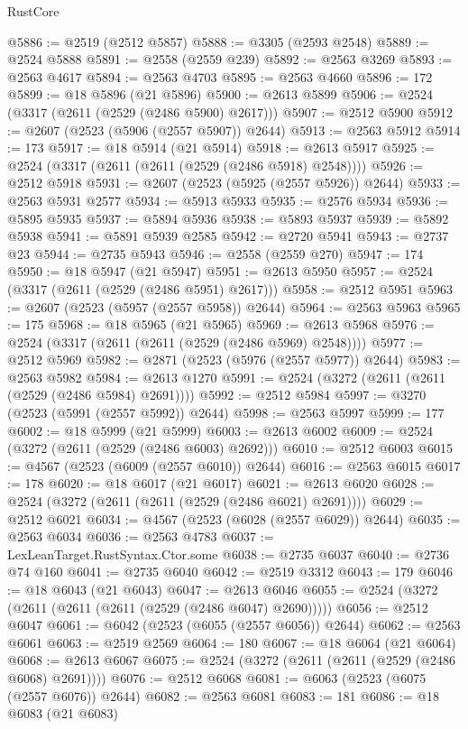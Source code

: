 \begin{lexlean}{RustCore}
\begin{coremodule}
@5886 := @2519 (@2512 @5857)
@5888 := @3305 (@2593 @2548)
@5889 := @2524 @5888
@5891 := @2558 (@2559 @239)
@5892 := @2563 @3269
@5893 := @2563 @4617
@5894 := @2563 @4703
@5895 := @2563 @4660
@5896 := 172
@5899 := @18 @5896 (@21 @5896)
@5900 := @2613 @5899
@5906 := @2524 (@3317 (@2611 (@2529 (@2486 @5900) @2617)))
@5907 := @2512 @5900
@5912 := @2607 (@2523 (@5906 (@2557 @5907)) @2644)
@5913 := @2563 @5912
@5914 := 173
@5917 := @18 @5914 (@21 @5914)
@5918 := @2613 @5917
@5925 := @2524 (@3317 (@2611 (@2611 (@2529 (@2486 @5918) @2548))))
@5926 := @2512 @5918
@5931 := @2607 (@2523 (@5925 (@2557 @5926)) @2644)
@5933 := @2563 @5931 @2577
@5934 := @5913 @5933
@5935 := @2576 @5934
@5936 := @5895 @5935
@5937 := @5894 @5936
@5938 := @5893 @5937
@5939 := @5892 @5938
@5941 := @5891 @5939 @2585
@5942 := @2720 @5941
@5943 := @2737 @23
@5944 := @2735 @5943
@5946 := @2558 (@2559 @270)
@5947 := 174
@5950 := @18 @5947 (@21 @5947)
@5951 := @2613 @5950
@5957 := @2524 (@3317 (@2611 (@2529 (@2486 @5951) @2617)))
@5958 := @2512 @5951
@5963 := @2607 (@2523 (@5957 (@2557 @5958)) @2644)
@5964 := @2563 @5963
@5965 := 175
@5968 := @18 @5965 (@21 @5965)
@5969 := @2613 @5968
@5976 := @2524 (@3317 (@2611 (@2611 (@2529 (@2486 @5969) @2548))))
@5977 := @2512 @5969
@5982 := @2871 (@2523 (@5976 (@2557 @5977)) @2644)
@5983 := @2563 @5982
@5984 := @2613 @1270
@5991 := @2524 (@3272 (@2611 (@2611 (@2529 (@2486 @5984) @2691))))
@5992 := @2512 @5984
@5997 := @3270 (@2523 (@5991 (@2557 @5992)) @2644)
@5998 := @2563 @5997
@5999 := 177
@6002 := @18 @5999 (@21 @5999)
@6003 := @2613 @6002
@6009 := @2524 (@3272 (@2611 (@2529 (@2486 @6003) @2692)))
@6010 := @2512 @6003
@6015 := @4567 (@2523 (@6009 (@2557 @6010)) @2644)
@6016 := @2563 @6015
@6017 := 178
@6020 := @18 @6017 (@21 @6017)
@6021 := @2613 @6020
@6028 := @2524 (@3272 (@2611 (@2611 (@2529 (@2486 @6021) @2691))))
@6029 := @2512 @6021
@6034 := @4567 (@2523 (@6028 (@2557 @6029)) @2644)
@6035 := @2563 @6034
@6036 := @2563 @4783
@6037 := LexLeanTarget.RustSyntax.Ctor.some
@6038 := @2735 @6037
@6040 := @2736 @74 @160
@6041 := @2735 @6040
@6042 := @2519 @3312
@6043 := 179
@6046 := @18 @6043 (@21 @6043)
@6047 := @2613 @6046
@6055 := @2524 (@3272 (@2611 (@2611 (@2611 (@2529 (@2486 @6047) @2690)))))
@6056 := @2512 @6047
@6061 := @6042 (@2523 (@6055 (@2557 @6056)) @2644)
@6062 := @2563 @6061
@6063 := @2519 @2569
@6064 := 180
@6067 := @18 @6064 (@21 @6064)
@6068 := @2613 @6067
@6075 := @2524 (@3272 (@2611 (@2611 (@2529 (@2486 @6068) @2691))))
@6076 := @2512 @6068
@6081 := @6063 (@2523 (@6075 (@2557 @6076)) @2644)
@6082 := @2563 @6081
@6083 := 181
@6086 := @18 @6083 (@21 @6083)

\end{coremodule}
\end{lexlean}
